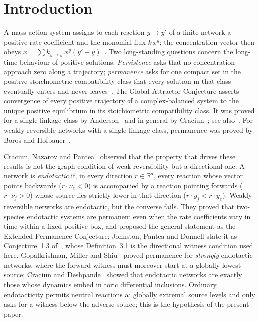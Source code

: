 \documentclass[11pt]{article}
\theoremstyle{definition}
\theoremstyle{remark}
\newcommand{\R}{\mathbb R}
\begin{document}
\section{Introduction}\label{sec:intro}

A mass-action system assigns to each reaction $y\to y'$ of a finite network a
positive rate coefficient and the monomial flux $k\,x^{y}$; the concentration
vector then obeys $\dot x=\sum k_{y\to y'}x^{y}(y'-y)$~\cite{HornJackson1972,Feinberg1972}.
Two long-standing questions concern the long-time behaviour of positive solutions.
\emph{Persistence} asks that no concentration approach zero along a trajectory;
\emph{permanence} asks for one compact set in the positive stoichiometric
compatibility class that every solution in that class eventually enters and never
leaves~\cite{AngeliDeLeenheerSontag2007,CraciunNazarovPantea2013}. The Global
Attractor Conjecture asserts convergence of every positive trajectory of a
complex-balanced system to the unique positive equilibrium in its stoichiometric
compatibility class. It was proved
for a single linkage class by Anderson~\cite{Anderson2011} and in general by
Craciun~\cite{Craciun2015}; see also~\cite{Pantea2012,GopalkrishnanMillerShiu2014}.
For weakly reversible networks with a single linkage class, permanence was proved
by Boros and Hofbauer~\cite{BorosHofbauer2020}.

Craciun, Nazarov and Pantea~\cite{CraciunNazarovPantea2013} observed that the
property that drives these results is not the graph condition of weak
reversibility but a directional one. A network is \emph{endotactic} if, in every
direction $r\in\R^d$, every reaction whose vector points backwards ($r\cdot\nu_e<0$)
is accompanied by a reaction pointing forwards ($r\cdot\nu_j>0$) whose source lies
strictly lower in that direction ($r\cdot y_j<r\cdot y_e$). Weakly reversible
networks are endotactic, but the converse fails. They proved that two-species
endotactic systems are permanent even when the rate coefficients vary in time
within a fixed positive box, and proposed the general statement as the Extended
Permanence Conjecture; Johnston, Pantea and Donnell state it as
Conjecture~1.3 of~\cite{JohnstonPanteaDonnell2016}, whose Definition~3.1 is the
directional witness condition used here. Gopalkrishnan, Miller and
Shiu~\cite{GopalkrishnanMillerShiu2014} proved permanence for \emph{strongly}
endotactic networks, where the forward witness must moreover start at a globally
lowest source; Craciun and Deshpande~\cite{CraciunDeshpande2020} showed that
endotactic networks are exactly those whose dynamics embed in toric differential
inclusions. Ordinary endotacticity permits neutral reactions at globally extremal
source levels and only asks for a witness below the adverse source; this is the
hypothesis of the present paper.
\end{document}
